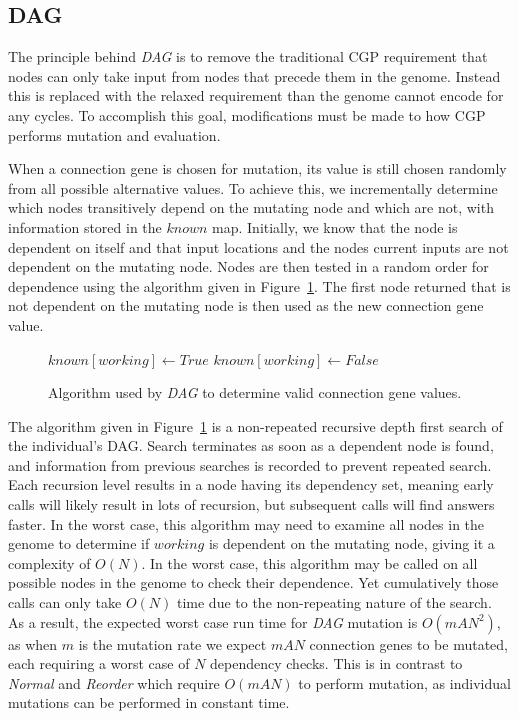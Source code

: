\documentclass[journal]{IEEEtran}
\begin{document}
\subsection{DAG}
The principle behind \emph{DAG} is to remove the traditional CGP requirement that
nodes can only take input from nodes that precede them in the genome.  Instead
this is replaced with the relaxed requirement than the genome cannot encode for
any cycles.  To accomplish this goal, modifications must be made to how CGP
performs mutation and evaluation.

When a connection gene is chosen for mutation, its value is still chosen randomly
from all possible alternative values.  To achieve this, we incrementally determine
which nodes transitively depend on the mutating node and which are not, with
information stored in the $known$ map.  Initially, we know that the node
is dependent on itself and that input locations and the nodes current inputs
are not dependent on the mutating node.  Nodes are then
tested in a random order for dependence using the algorithm given in Figure~\ref{fig:dag}.
The first node returned that is not dependent on the mutating node is then
used as the new connection gene value.

\begin{figure}
  \begin{algorithmic}
      \State{}
    \EndIf
        \State $known[working] \leftarrow True$
        \State{}
      \EndIf
    \EndFor
    \State $known[working] \leftarrow False$
    \State{}
  \EndProcedure
  \end{algorithmic}
  \caption{Algorithm used by \emph{DAG} to determine valid connection gene values.}
  \label{fig:dag}
\end{figure}

The algorithm given in Figure~\ref{fig:dag} is a non-repeated recursive depth
first search of the individual's DAG.  Search terminates as soon as a dependent
node is found, and information from previous searches is recorded to prevent
repeated search.  Each recursion level results in a node having its dependency
set, meaning early calls will likely result in lots of recursion, but subsequent
calls will find answers faster.  In the worst case, this algorithm may need
to examine all nodes in the genome to determine if $working$ is dependent on the
mutating node, giving it a complexity of $O(N)$.  In the worst case, this algorithm
may be called on all possible nodes in the genome to check their dependence.
Yet cumulatively those calls can only take $O(N)$ time due to the non-repeating
nature of the search.  As a result, the expected worst case run time for \emph{DAG}
mutation is $O(mAN^2)$, as when $m$ is the mutation rate we expect $mAN$
connection genes to be mutated, each requiring a worst case of $N$ dependency checks.
This is in contrast to \emph{Normal} and \emph{Reorder} which require $O(mAN)$ to perform
mutation, as individual mutations can be performed in constant time.
\end{document}
